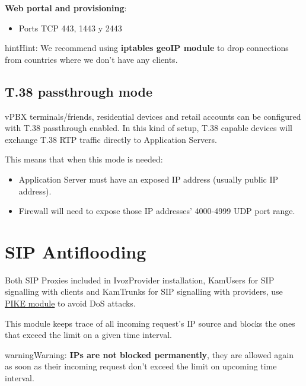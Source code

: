 \documentclass[letterpaper,10pt,english]{sphinxmanual}
\begin{document}
\textbf{Web portal and provisioning}:
\begin{itemize}
\item {} 
Ports TCP 443, 1443 y 2443

\end{itemize}

\begin{notice}{hint}{Hint:}
We recommend using \textbf{iptables geoIP module} to drop connections from
countries where we don't have any clients.
\end{notice}


\subsection{T.38 passthrough mode}
\label{security_and_maintenance/security/firewall:t-38-passthrough-mode}
vPBX terminals/friends, residential devices and retail accounts can be configured with T.38 passthrough enabled. In this
kind of setup, T.38 capable devices will exchange T.38 RTP traffic directly to Application Servers.

This means that when this mode is needed:
\begin{itemize}
\item {} 
Application Server must have an exposed IP address (usually public IP address).

\item {} 
Firewall will need to expose those IP addresses' 4000-4999 UDP port range.

\end{itemize}


\section{SIP Antiflooding}
\label{security_and_maintenance/security/antiflooding::doc}\label{security_and_maintenance/security/antiflooding:sip-antiflooding}
Both SIP Proxies included in IvozProvider installation, KamUsers for SIP signalling with clients and KamTrunks for SIP
signalling with providers, use \href{http://kamailio.org/docs/modules/5.1.x/modules/pike.html}{PIKE module} to avoid DoS
attacks.

This module keeps trace of all incoming request's IP source and blocks the ones that exceed the limit on a given time
interval.

\begin{notice}{warning}{Warning:}
\textbf{IPs are not blocked permanently}, they are allowed again as soon as their incoming request don't exceed the limit
on upcoming time interval.
\end{notice}
\end{document}
